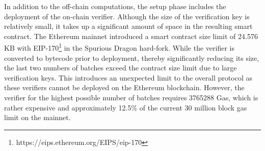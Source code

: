 In addition to the off-chain computations, the setup phase includes the deployment of the on-chain verifier. Although the size of the verification key is relatively small, it takes up a significant amount of space in the resulting smart contract. The Ethereum mainnet introduced a smart contract size limit of 24.576 KB with EIP-170\footnote{https://eips.ethereum.org/EIPS/eip-170} in the Spurious Dragon hard-fork. While the verifier is converted to bytecode prior to deployment, thereby significantly reducing its size, the last two numbers of batches exceed the contract size limit due to large verification keys. This introduces an unexpected limit to the overall protocol as these verifiers cannot be deployed on the Ethereum blockchain. However, the verifier for the highest possible number of batches requires 3765288 Gas, which is rather expensive and approximately 12.5\% of the current 30 million block gas limit on the mainnet.

